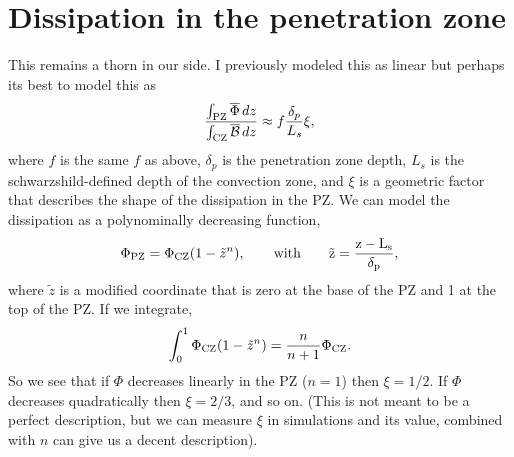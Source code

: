 \documentclass[12pt]{article}
\renewcommand{\bar}[1]{\overline{#1}}
\newcommand{\mB}{\ensuremath{\mathcal{B}}}
\begin{document}
\section{Dissipation in the penetration zone}
This remains a thorn in our side. 
I previously modeled this as linear but perhaps its best to model this as
\begin{equation}
\frac{\int_{\rm{PZ}}\bar{\Phi}\,dz}{\int_{\rm{CZ}}\bar{\mB}\,dz} \approx f\frac{\delta_p}{L_s}\xi,
\label{eqn:xi_defn}
\end{equation}
where $f$ is the same $f$ as above, $\delta_p$ is the penetration zone depth, $L_s$ is the schwarzshild-defined depth of the convection zone, and $\xi$ is a geometric factor that describes the shape of the dissipation in the PZ.
We can model the dissipation as a polynominally decreasing function,
\begin{equation}
\Phi_{\rm{PZ}} = \Phi_{\rm{CZ}}(1 - \tilde{z}^{n}),\qquad
\rm{with}\qquad
\tilde{z} = \frac{z - L_s}{\delta_p},
\end{equation}
where $\tilde{z}$ is a modified coordinate that is zero at the base of the PZ and 1 at the top of the PZ.
If we integrate,
\begin{equation}
\int_{0}^{1} \Phi_{\rm{CZ}}(1 - \tilde{z}^{n}) = \frac{n}{n+1}\Phi_{\rm{CZ}}.
\end{equation}
So we see that if $\Phi$ decreases linearly in the PZ ($n = 1$) then $\xi = 1/2$.
If $\Phi$ decreases quadratically then $\xi = 2/3$, and so on.
(This is not meant to be a perfect description, but we can measure $\xi$ in simulations and its value, combined with $n$ can give us a decent description).
\end{document}
